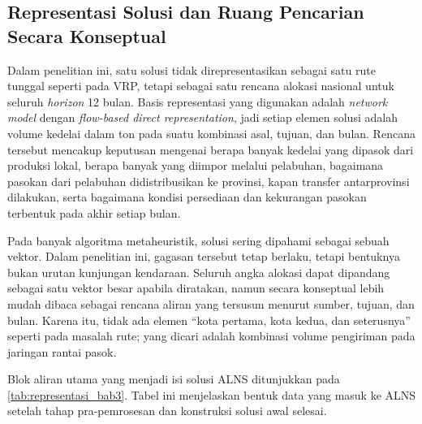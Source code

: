 \documentclass{file/TA-ITS}
\theoremstyle{definition}
\theoremstyle{definition}
\theoremstyle{plain}
\begin{document}
\subsection{Representasi Solusi dan Ruang Pencarian Secara Konseptual}

Dalam penelitian ini, satu solusi tidak direpresentasikan sebagai satu rute tunggal seperti pada VRP, tetapi sebagai satu rencana alokasi nasional untuk seluruh \textit{horizon} 12 bulan. Basis representasi yang digunakan adalah \textit{network model} dengan \textit{flow-based direct representation}, jadi setiap elemen solusi adalah volume kedelai dalam ton pada suatu kombinasi asal, tujuan, dan bulan. Rencana tersebut mencakup keputusan mengenai berapa banyak kedelai yang dipasok dari produksi lokal, berapa banyak yang diimpor melalui pelabuhan, bagaimana pasokan dari pelabuhan didistribusikan ke provinsi, kapan transfer antarprovinsi dilakukan, serta bagaimana kondisi persediaan dan kekurangan pasokan terbentuk pada akhir setiap bulan.

Pada banyak algoritma metaheuristik, solusi sering dipahami sebagai sebuah vektor. Dalam penelitian ini, gagasan tersebut tetap berlaku, tetapi bentuknya bukan urutan kunjungan kendaraan. Seluruh angka alokasi dapat dipandang sebagai satu vektor besar apabila diratakan, namun secara konseptual lebih mudah dibaca sebagai rencana aliran yang tersusun menurut sumber, tujuan, dan bulan. Karena itu, tidak ada elemen ``kota pertama, kota kedua, dan seterusnya'' seperti pada masalah rute; yang dicari adalah kombinasi volume pengiriman pada jaringan rantai pasok.

Blok aliran utama yang menjadi isi solusi ALNS ditunjukkan pada \ref{tab:representasi_bab3}. Tabel ini menjelaskan bentuk data yang masuk ke ALNS setelah tahap pra-pemrosesan dan konstruksi solusi awal selesai.
\end{document}
